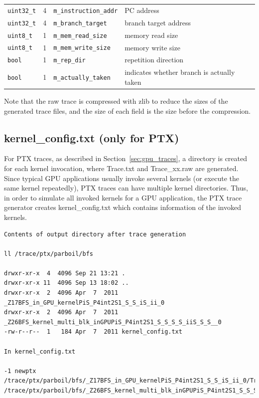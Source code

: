 \begin{footnotesize}
\begin{tabular}{llll}
\Verb+uint32_t+ & 4            & \Verb+m_instruction_addr+ & PC address                                             \\
\Verb+uint32_t+ & 4            & \Verb+m_branch_target+    & branch target address                                  \\
\Verb+uint8_t+  & 1            & \Verb+m_mem_read_size+    & memory read size                                       \\ 
\Verb+uint8_t+  & 1            & \Verb+m_mem_write_size+   & memory write size                                      \\
\Verb+bool+     & 1            & \Verb+m_rep_dir+          & repetition direction                                   \\
\Verb+bool+     & 1            & \Verb+m_actually_taken+   & indicates whether branch is actually taken             \\
\end{tabular}
\end{footnotesize}
\vspace{0.2in}


Note that the raw trace is compressed with zlib to reduce the sizes of
the generated trace files, and the size of each field is the size
before the compression.


\subsection{kernel\_config.txt (only for PTX)}
\label{sec:kern_config}

For PTX traces, as described in Section~\ref{sec:gpu_traces}, a directory is
created for each kernel invocation, where Trace.txt and Trace\_xx.raw are
generated. Since typical GPU applications usually invoke several kernels (or
    execute the same kernel repeatedly), PTX traces can have multiple kernel
directories. Thus, in order to simulate all invoked kernels for a GPU
application, the PTX trace generator creates kernel\_config.txt which contains
information of the invoked kernels.


\begin{Verbatim}
Contents of output directory after trace generation

ll /trace/ptx/parboil/bfs

drwxr-xr-x  4  4096 Sep 21 13:21 .
drwxr-xr-x 11  4096 Sep 13 18:02 ..
drwxr-xr-x  2  4096 Apr  7  2011 _Z17BFS_in_GPU_kernelPiS_P4int2S1_S_S_iS_ii_0
drwxr-xr-x  2  4096 Apr  7  2011 _Z26BFS_kernel_multi_blk_inGPUPiS_P4int2S1_S_S_S_S_iiS_S_S__0
-rw-r--r--  1   184 Apr  7  2011 kernel_config.txt

In kernel_config.txt

-1 newptx
/trace/ptx/parboil/bfs/_Z17BFS_in_GPU_kernelPiS_P4int2S1_S_S_iS_ii_0/Trace.txt
/trace/ptx/parboil/bfs/_Z26BFS_kernel_multi_blk_inGPUPiS_P4int2S1_S_S_S_S_iiS_S_S__0/Trace.txt
\end{Verbatim}


